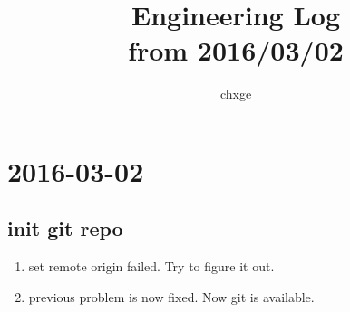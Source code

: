 \documentclass{ctexart}
\begin{document}
\title{%
	Engineering Log\\ \small from 2016/03/02}
\author{%
	chxge}
\maketitle

\tableofcontents
	
\section[03/02]{2016-03-02}
	\subsection{init git repo}
		\begin{enumerate}
			\item <21:11>set remote origin failed. Try to figure it out.
			\item <21:16>previous problem is now fixed. Now git is available.
		\end{enumerate}
\end{document}
